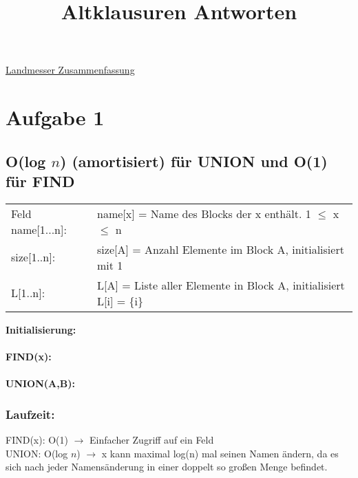\documentclass[10pt,a4paper]{article}
\title{Altklausuren Antworten}
\date{}
\begin{document}
\maketitle
\href{https://github.com/ofenstichloch/Uni/blob/master/Kapitel\%20ADS/VL.pdf}{Landmesser Zusammenfassung}
\section*{Aufgabe 1}
\subsection*{O(log $n$) (amortisiert) für UNION und O(1) für FIND}

\begin{tabular}{ll}
     Feld name[1...n]:& name[x] = Name des Blocks der x enthält. 1 $\leq$ x $\leq$ n \\
     size[1..n]:& size[A] = Anzahl Elemente im Block A, initialisiert mit 1 \\ 
     L[1..n]: & L[A] = Liste aller Elemente in Block A, initialisiert L[i] = \{i\}
\end{tabular}
\begin{algorithm}[H]

    \textbf{Initialisierung:}	\\
	~\\
	\textbf{FIND(x):} \\
	~\\
	\textbf{UNION(A,B):} \\
    
	
\end{algorithm}
\subsubsection*{Laufzeit:}
FIND(x): O(1) $\rightarrow$ Einfacher Zugriff auf ein Feld\\ 
UNION: O(log $n$) $\rightarrow$ x kann maximal log(n) mal seinen Namen ändern, da es sich nach jeder Namensänderung in einer doppelt so großen Menge befindet. 
\end{document}
